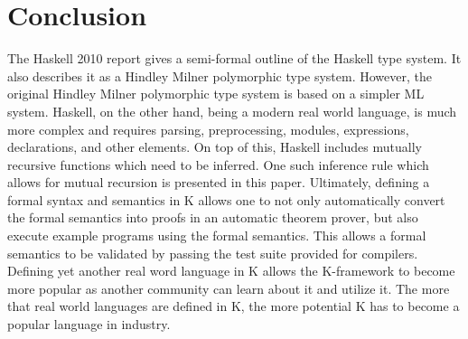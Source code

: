 \chapter{Conclusion}

The Haskell 2010 report gives a semi-formal outline of the Haskell type system. It also describes it as a Hindley Milner polymorphic type system. However, the original Hindley Milner polymorphic type system is based on a simpler ML system. Haskell, on the other hand, being a modern real world language, is much more complex and requires parsing, preprocessing, modules, expressions, declarations, and other elements. On top of this, Haskell includes mutually recursive functions which need to be inferred. One such inference rule which allows for mutual recursion is presented in this paper. Ultimately, defining a formal syntax and semantics in K allows one to not only automatically convert the formal semantics into proofs in an automatic theorem prover, but also execute example programs using the formal semantics. This allows a formal semantics to be validated by passing the test suite provided for compilers. Defining yet another real word language in K allows the K-framework to become more popular as another community can learn about it and utilize it. The more that real world languages are defined in K, the more potential K has to become a popular language in industry.